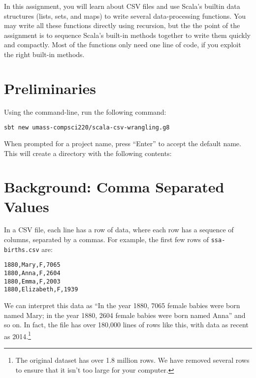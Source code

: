 \documentclass[9pt]{extbook}
\begin{document}
In this assignment, you will learn about CSV files and use Scala's builtin
data structures (lists, sets, and maps) to write several data-processing functions.
You may write all these functions directly using recursion, but the
the point of the assignment is to sequence Scala's built-in methods together
to write them quickly and compactly. Most of the functions only need
one line of code, if you exploit the right built-in methods.

\section{Preliminaries}

Using the command-line, run the following command:
\begin{lstlisting}
sbt new umass-compsci220/scala-csv-wrangling.g8
\end{lstlisting}
When prompted for a project name, press ``Enter'' to accept the default name.
This will create a directory with the following contents:


\section{Background: Comma Separated Values}

In a CSV file, each line has a row of data, where each row
has a sequence of columns, separated by a commas. For example, the
first few rows of \texttt{ssa-births.csv} are:

\begin{verbatim}
1880,Mary,F,7065
1880,Anna,F,2604
1880,Emma,F,2003
1880,Elizabeth,F,1939
\end{verbatim}

We can interpret this data as ``In the year 1880, 7065 female babies were born
named Mary; in the year 1880, 2604 female babies were born named Anna'' and so on.
In fact, the file has over 180,000 lines of rows like this, with data
as recent as 2014.\footnote{The original dataset has over 1.8 million rows.
We have removed several rows to ensure that it isn't too large for your
computer.}
\end{document}
